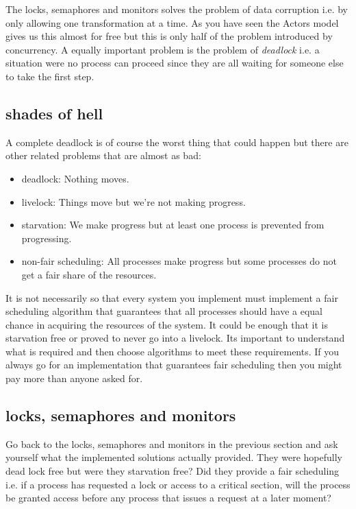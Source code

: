 \documentclass[a4paper,11pt]{article}
\begin{document}
The locks, semaphores and monitors solves the problem of data
corruption i.e. by only allowing one transformation at a time. As you
have seen the Actors model gives us this almost for free but this is
only half of the problem introduced by concurrency. A equally important
problem is the problem of {\em deadlock} i.e. a situation were no
process can proceed since they are all waiting for someone else to
take the first step.


\subsection{shades of hell}

A complete deadlock is of course the worst thing that could happen but
there are other related problems that are almost as bad:

\begin{itemize}
  \item deadlock: Nothing moves.
  \item livelock: Things move but we're not making progress.
  \item starvation: We make progress but at least one process is prevented from progressing.
  \item non-fair scheduling: All processes make progress but some processes do not get a fair share of the resources. 
\end{itemize}

It is not necessarily so that every system you implement must
implement a fair scheduling algorithm that guarantees that all
processes should have a equal chance in acquiring the resources of the
system. It could be enough that it is starvation free or proved to
never go into a livelock. Its important to understand what is required
and then choose algorithms to meet these requirements. If you always
go for an implementation that guarantees fair scheduling then you
might pay more than anyone asked for.


\subsection{locks, semaphores and monitors}

Go back to the locks, semaphores and monitors in the previous section
and ask yourself what the implemented solutions actually provided. They
were hopefully dead lock free but were they starvation free? Did they
provide a fair scheduling i.e. if a process has requested a lock or
access to a critical section, will the process be granted access
before any process that issues a request at a later moment?
\end{document}
